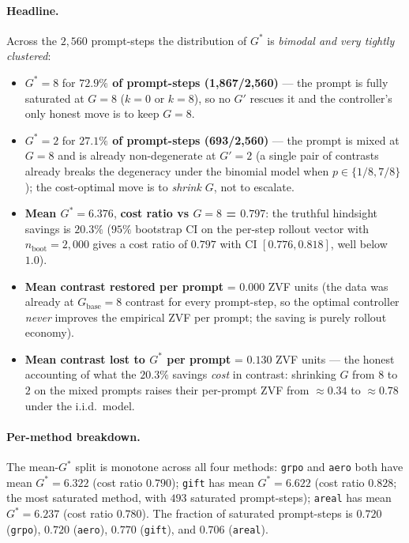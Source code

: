\paragraph{Headline.}
Across the $2{,}560$ prompt-steps the distribution of $G^*$ is
\emph{bimodal and very tightly clustered}:
\begin{itemize}
\item $G^* = 8$ for \textbf{$72.9\%$ of prompt-steps (1{,}867/2{,}560)} ---
the prompt is fully saturated at $G{=}8$ ($k = 0$ or $k = 8$), so no
$G'$ rescues it and the controller's only honest move is to keep $G = 8$.
\item $G^* = 2$ for \textbf{$27.1\%$ of prompt-steps (693/2{,}560)} ---
the prompt is mixed at $G{=}8$ and is already non-degenerate at
$G' = 2$ (a single pair of contrasts already breaks the degeneracy
under the binomial model when $p \in \{1/8, 7/8\}$); the cost-optimal
move is to \emph{shrink $G$}, not to escalate.
\item \textbf{Mean $G^* = 6.376$}, \textbf{cost ratio vs $G{=}8$ =
$0.797$}: the truthful hindsight savings is $20.3\%$
($95\%$ bootstrap CI on the per-step rollout vector with
$n_\text{boot}=2{,}000$ gives a cost ratio of $0.797$ with CI
$[0.776, 0.818]$, well below $1.0$).
\item \textbf{Mean contrast restored per prompt} = $0.000$ ZVF units
(the data was already at $G_\text{base}{=}8$ contrast for every
prompt-step, so the optimal controller \emph{never} improves the
empirical ZVF per prompt; the saving is purely rollout economy).
\item \textbf{Mean contrast lost to $G^*$ per prompt} = $0.130$ ZVF
units --- the honest accounting of what the $20.3\%$ savings
\emph{cost} in contrast: shrinking $G$ from $8$ to $2$ on the mixed
prompts raises their per-prompt ZVF from $\approx 0.34$ to
$\approx 0.78$ under the i.i.d.\ model.
\end{itemize}

\paragraph{Per-method breakdown.}
The mean-$G^*$ split is monotone across all four methods:
\texttt{grpo} and \texttt{aero} both have mean $G^*=6.322$
(cost ratio $0.790$); \texttt{gift} has mean $G^* = 6.622$ (cost
ratio $0.828$; the most saturated method, with $493$ saturated
prompt-steps); \texttt{areal} has mean $G^* = 6.237$
(cost ratio $0.780$). The fraction of saturated prompt-steps is
$0.720$ (\texttt{grpo}), $0.720$ (\texttt{aero}), $0.770$
(\texttt{gift}), and $0.706$ (\texttt{areal}).

